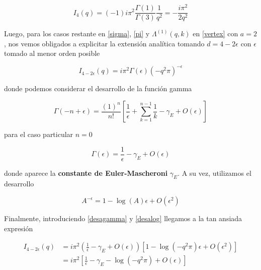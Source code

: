 \documentclass[tickz]{article}
\numberwithin{equation}{section}
\begin{document}
\begin{boxquation}
\begin{equation}\label{idvertex}
I_4(q)=(-1) i \pi^2 \frac{\Gamma(1)}{\Gamma(3)} \frac{1}{q^2} = -\frac{i \pi^2}{2q^2} 
\end{equation}
\end{boxquation}

Luego, para los casos restante en \ref{sigma}, \ref{pi} y $ \Lambda^{(1)}(q,k) $ en \ref{vertex} con $ a=2 $, nos vemos obligados a explicitar la extensión analítica tomando $ d=4-2\epsilon $ con $ \epsilon $ tomado al menor orden posible

\begin{equation}\label{key}
I_{4-2\epsilon}(q)=i \pi^2 \Gamma(\epsilon ) \left(-q^2 \pi \right)^{-\epsilon}
\end{equation}

donde podemos considerar el desarrollo de la función gamma

\begin{equation}
\Gamma(-n + \epsilon) = \frac{(1)^n}{n!} \left[ \frac{1}{\epsilon} + \sum_{k=1}^{n-1}\frac{1}{k} - \gamma_E + O(\epsilon)\right]
\end{equation}

para el caso particular $ n=0 $

\begin{equation}\label{desagamma}
\Gamma(\epsilon)= \frac{1}{\epsilon} - \gamma_E + O(\epsilon) 
\end{equation}

donde aparece la \textbf{constante de Euler-Mascheroni} $ \gamma_E $. A su vez, utilizamos el desarrollo 

\begin{equation}\label{desalog}
A^{-\epsilon} = 1 -\log(A) \epsilon  + O(\epsilon^2)
\end{equation}

Finalmente, introduciendo \ref{desagamma} y \ref{desalog} llegamos a la tan ansiada expresión

\begin{boxquation}
\begin{equation}\label{solucion}
\begin{aligned}
I_{4-2\epsilon}(q)&=i \pi^2 \left(\frac{1}{\epsilon} - \gamma_E + O(\epsilon) \right) \left[1 - \log\left(-q^2\pi \right) \epsilon + O(\epsilon^2) \right]\\
&=i \pi^2 \left[ \frac{1}{\epsilon} - \gamma_E - \log\left(-q^2\pi\right) + O(\epsilon) \right]
\end{aligned}
\end{equation}
\end{boxquation}
\end{document}
